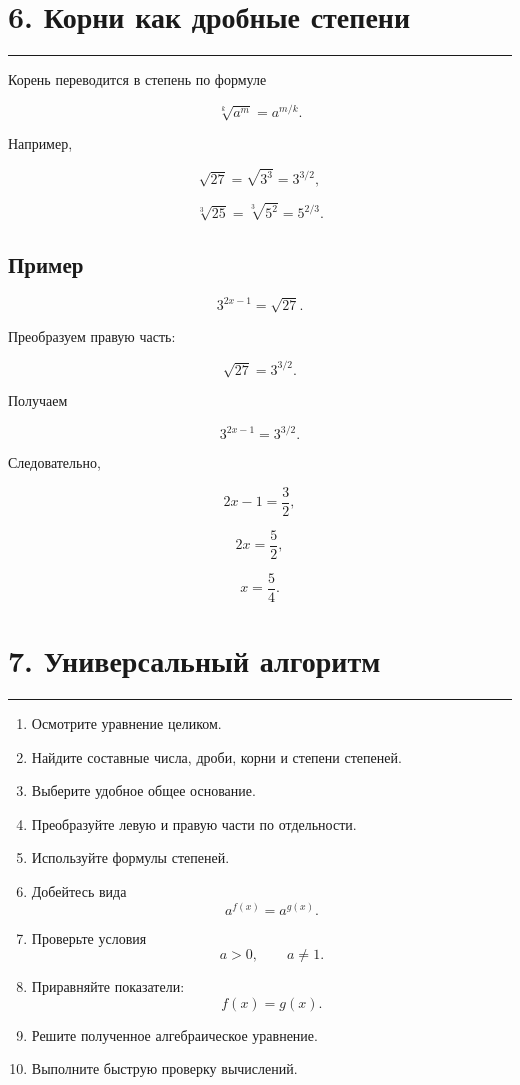 \documentclass[a4paper,12pt]{article}
\newcommand{\sectionline}{\par\vspace{0.15em}\noindent\textcolor{accent}{\rule{\linewidth}{0.7pt}}\par\vspace{0.2em}}
\begin{document}

\section*{6. Корни как дробные степени}
\sectionline

Корень переводится в степень по формуле

\[
\sqrt[k]{a^m}=a^{m/k}.
\]

Например,

\[
\sqrt{27}
=
\sqrt{3^3}
=
3^{3/2},
\]

\[
\sqrt[3]{25}
=
\sqrt[3]{5^2}
=
5^{2/3}.
\]

\subsection*{Пример}

\[
3^{2x-1}=\sqrt{27}.
\]

Преобразуем правую часть:

\[
\sqrt{27}=3^{3/2}.
\]

Получаем

\[
3^{2x-1}=3^{3/2}.
\]

Следовательно,

\[
2x-1=\frac32,
\]

\[
2x=\frac52,
\]

\[
\boxed{x=\frac54}.
\]


\section*{7. Универсальный алгоритм}
\sectionline

\begin{enumerate}
  \item Осмотрите уравнение целиком.
  \item Найдите составные числа, дроби, корни и степени степеней.
  \item Выберите удобное общее основание.
  \item Преобразуйте левую и правую части по отдельности.
  \item Используйте формулы степеней.
  \item Добейтесь вида
  \[
  a^{f(x)}=a^{g(x)}.
  \]
  \item Проверьте условия
  \[
  a>0,
  \qquad
  a\ne1.
  \]
  \item Приравняйте показатели:
  \[
  f(x)=g(x).
  \]
  \item Решите полученное алгебраическое уравнение.
  \item Выполните быструю проверку вычислений.
\end{enumerate}
\end{document}
